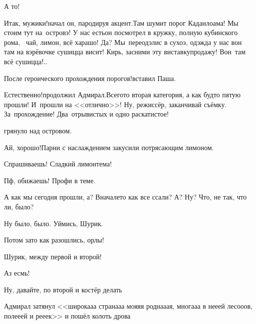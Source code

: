 \diagdash А то!

\diagdash Итак, мужики!\mdash начал он, пародируя акцент.\mdash Там шумит порог Каданлоама! Мы стоим тут на~островэ! У нас есть\myldots{}\mdash он посмотрел в кружку, полную кубинского рома,\mdash~ \myldots{}чай, лимон, всё харашо! Да? Мы~переодэлис в сухоэ, одэжда у нас вон там на вэрёвочке сушицца висит! Кирь, засними эту виставку\sdash продажу! Вон~там всё сушицца$\exldots$%


\diagdash После героического прохождения порогов!\mdash вставил Паша.

\diagdash Естественно!\mdash продолжил Адмирал.\mdash Всего\sdash то вторая категория, а как будто пятую прошли! И~прошли на <<отлично>>! Ну, режиссёр, заканчивай съёмку. За~прохождение! Два~отрывистых и одно раскатистое!

\mdash грянуло над островом.

\diagdash Ай, хорошо!\mdash Парни с наслаждением закусили потрясающим лимоном.

\diagdash Спрашиваешь! Сладкий лимон\mdash тема!

\diagdash Пф, обижаешь! Профи в теме.

\diagdash А как мы сегодня прошли, а? Вначале\sdash то как все ссали? А? Ну? Что, не так, что ли, было?

\diagdash Ну было, было. Уймись, Шурик.

\diagdash Потом зато как разошлись, орлы!

\diagdash Шурик, между первой и второй!

\diagdash Аз есмь!

\diagdash Ну, давайте, по второй и костёр делать\myldots{}

Адмирал затянул <<широка\sdash а\sdash а страна\sdash а\sdash а моя\sdash я\sdash я родна\sdash а\sdash ая, многа\sdash а\sdash а в не\sdash е\sdash ей лесо\sdash о\sdash ов, поле\sdash е\sdash ей и ре\sdash е\sdash ек>> и пошёл колоть дрова\myldots{}

\vspace{1.0cm}

 
